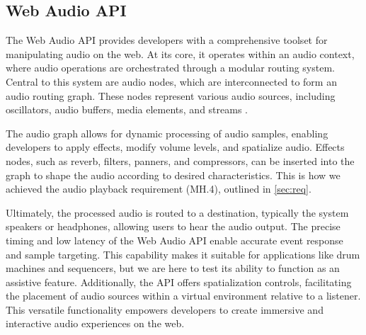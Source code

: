 \documentclass{l4proj}
\begin{document}
    
    
    



\subsection{Web Audio API}
\label{sec:web-audio-API}

The Web Audio API provides developers with a comprehensive toolset for manipulating audio on the web. At its core, it operates within an audio context, where audio operations are orchestrated through a modular routing system. Central to this system are audio nodes, which are interconnected to form an audio routing graph. These nodes represent various audio sources, including oscillators, audio buffers, media elements, and streams \citep{MozDevNet}. 

The audio graph allows for dynamic processing of audio samples, enabling developers to apply effects, modify volume levels, and spatialize audio. Effects nodes, such as reverb, filters, panners, and compressors, can be inserted into the graph to shape the audio according to desired characteristics. This is how we achieved the audio playback requirement (MH.4), outlined in \ref{sec:req}.

Ultimately, the processed audio is routed to a destination, typically the system speakers or headphones, allowing users to hear the audio output. The precise timing and low latency of the Web Audio API enable accurate event response and sample targeting. This capability makes it suitable for applications like drum machines and sequencers, but we are here to test its ability to function as an assistive feature.  Additionally, the API offers spatialization controls, facilitating the placement of audio sources within a virtual environment relative to a listener. This versatile functionality empowers developers to create immersive and interactive audio experiences on the web.
\end{document}
